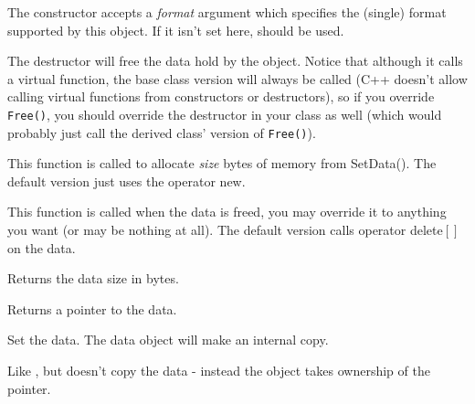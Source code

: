 The constructor accepts a {\it format} argument which specifies the (single)
format supported by this object. If it isn't set here, 
 should be used.

\label{wxcustomdataobjectdtor}


The destructor will free the data hold by the object. Notice that although it
calls a virtual  function, the base
class version will always be called (C++ doesn't allow calling virtual
functions from constructors or destructors), so if you override {\tt Free()}, you
should override the destructor in your class as well (which would probably
just call the derived class' version of {\tt Free()}).

\label{wxcustomdataobjectalloc}


This function is called to allocate {\it size} bytes of memory from SetData().
The default version just uses the operator new.

\label{wxcustomdataobjectfree}


This function is called when the data is freed, you may override it to anything
you want (or may be nothing at all). The default version calls operator
delete$[]$ on the data.

\label{wxcustomdataobjectgetsize}


Returns the data size in bytes.

\label{wxcustomdataobjectgetdata}


Returns a pointer to the data.

\label{wxcustomdataobjectsetdata}


Set the data. The data object will make an internal copy.


\label{wxcustomdataobjecttakedata}


Like , but doesn't copy the data -
instead the object takes ownership of the pointer.


